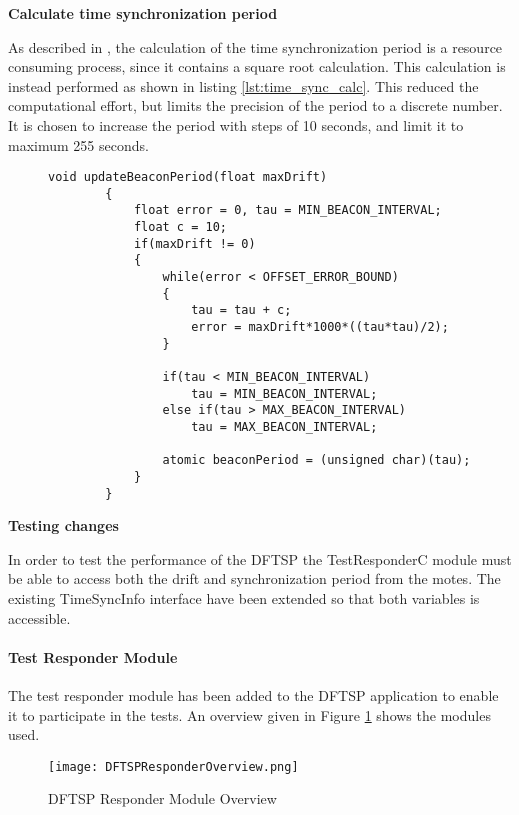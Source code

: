 \documentclass[Main]{subfiles}
\begin{document}
			    \newpage
			    \textbf{Calculate time synchronization period}

			    	As described in \cite{dynamicFTSParticle}, the calculation of the time synchronization period is a resource consuming process, since it contains a square root calculation.
			    	This calculation is instead performed as shown in listing \ref{lst:time_sync_calc}.
			    	This reduced the computational effort, but limits the precision of the period to a discrete number. 
			    	It is chosen to increase the period with steps of 10 seconds, and limit it to maximum 255 seconds.
			    	
					\begin{figure}[H]
						\begin{lstlisting}[caption=Calculate time synchronization period, style=Code-C, label=lst:time_sync_calc]
		void updateBeaconPeriod(float maxDrift)
	    {
	    	float error = 0, tau = MIN_BEACON_INTERVAL;
	    	float c = 10;
	    	if(maxDrift != 0)
	    	{
	    		while(error < OFFSET_ERROR_BOUND)
	    		{
	    			tau = tau + c;
	    			error = maxDrift*1000*((tau*tau)/2);
				}
				
				if(tau < MIN_BEACON_INTERVAL)
					tau = MIN_BEACON_INTERVAL;
				else if(tau > MAX_BEACON_INTERVAL)
					tau = MAX_BEACON_INTERVAL;
					
				atomic beaconPeriod = (unsigned char)(tau);
	    	}
	    }
			    		\end{lstlisting}
			    	\end{figure}			

				\textbf{Testing changes}

					In order to test the performance of the DFTSP the TestResponderC module must be able to access both the drift and synchronization period from the motes. 
					The existing TimeSyncInfo interface have been extended so that both variables is accessible.



			

			
			\newpage
			\paragraph{Test Responder Module} %
			\label{par:test_responder_module}
				The test responder module has been added to the DFTSP application to enable it to participate in the tests.
				An overview given in Figure \ref{fig:DFTSPResponderOverview} shows the modules used.

				\begin{figure}[H]
					\centering
					\texttt{[image: DFTSPResponderOverview.png]}
					\caption{DFTSP Responder Module Overview}
					\label{fig:DFTSPResponderOverview}
				\end{figure}
\end{document}

